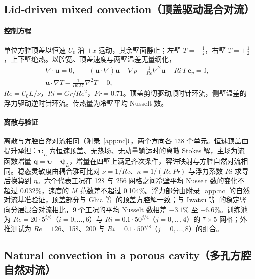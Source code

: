 \subsection{Lid-driven mixed convection（顶盖驱动混合对流）}
\label{app:mixed}

\paragraph{控制方程}
单位方腔顶盖以恒速 $U_0$ 沿 $+x$ 运动，其余壁面静止；左壁 $T=-\tfrac12$，右壁 $T=+\tfrac12$，上下壁绝热。以腔宽、顶盖速度与两壁温差无量纲化，
\begin{equation}
\begin{gathered}
\nabla\cdot\mathbf u=0,\qquad
(\mathbf u\cdot\nabla)\mathbf u+\nabla p-\frac1{Re}\nabla^2\mathbf u-Ri\,T\,\mathbf e_y=0,\\
\mathbf u\cdot\nabla T-\frac1{Re\,Pr}\nabla^2T=0,
\end{gathered}
\end{equation}
$Re=U_0L/\nu$，$Ri=Gr/Re^2$，$Pr=0.71$。顶盖剪切驱动顺时针环流，侧壁温差的浮力驱动逆时针环流。传热量为冷壁平均 Nusselt 数。

\paragraph{离散与验证}
离散与方腔自然对流相同（附录~\ref{app:nc}），两个方向各 128 个单元。恒速顶盖由提升承担：$\boldsymbol\psi_L$ 为恒速顶盖、无热场、无动量输运时的离散 Stokes 解，主场为流函数增量 $\mathbf q=\boldsymbol\psi-\boldsymbol\psi_L$，增量在四壁上满足齐次条件，容许映射与方腔自然对流相同。稳态灵敏度由耦合雅可比对 $\nu=1/Re$、$\kappa=1/(Re\,Pr)$ 与浮力系数 $Ri$ 求导后换算到 $\eta$。六个代表工况在 128 与 256 网格之间冷壁平均 Nusselt 数的变化不超过 0.032\%，速度的 $M$ 范数差不超过 0.104\%。浮力部分由附录~\ref{app:nc} 的自然对流基准验证，顶盖部分与 Ghia 等~\cite{ghia1982high}的顶盖方腔解一致；与 Iwatsu 等~\cite{iwatsu1993mixed}的稳定竖向分层混合对流相比，9 个工况的平均 Nusselt 数相差 $-3.1\%$ 至 $+6.6\%$。训练池为 $Re=20\cdot5^{i/6}$（$i=0,\ldots,6$）与 $Ri=0.1\cdot50^{j/4}$（$j=0,\ldots,4$）的 $7\times5$ 网格；外推测试为 $Re=126$、158、200 与 $Ri=0.1\cdot50^{j/8}$（$j=0,\ldots,8$）的组合。

\subsection{Natural convection in a porous cavity（多孔方腔自然对流）}
\label{app:porous}

